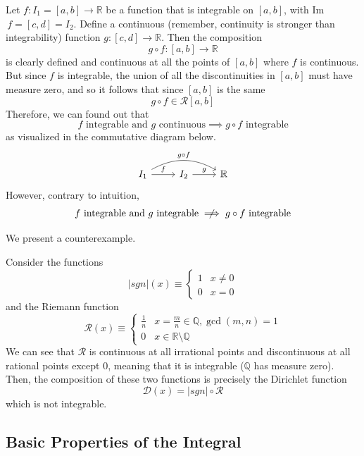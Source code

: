 \documentclass{article}
\begin{document}
      \begin{proposition}
      Let $f: I_1 = [a, b] \longrightarrow\mathbb{R}$ be a function that is integrable on $[a, b]$, with Im$\,f = [c, d] = I_2$. Define a continuous (remember, continuity is stronger than integrability) function $g: [c, d] \longrightarrow \mathbb{R}$. Then the composition
      \[g \circ f: [a, b] \longrightarrow \mathbb{R}\]
      is clearly defined and continuous at all the points of $[a, b]$ where $f$ is continuous. But since $f$ is integrable, the union of all the discontinuities in $[a, b]$ must have measure zero, and so it follows that since $[a, b]$ is the same  
      \[g \circ f \in \mathcal{R}[a, b]\]
      Therefore, we can found out that 
      \[f \text{ integrable and } g \text{ continuous} \implies g \circ f \text{ integrable}\]
      as visualized in the commutative diagram below. 
      \[
        \begin{tikzcd}
          I_1 \arrow[r, "f"] \arrow[rr, bend left, "g \circ f"] & I_2 \arrow[r, "g"] & \mathbb{R}
        \end{tikzcd}
      \]
      However, contrary to intuition, 
      \[f \text{ integrable and } g \text{ integrable} \centernot\implies g \circ f \text{ integrable}\]
      \end{proposition}

      We present a counterexample. 
    \begin{example}
    Consider the functions
    \[|sgn|(x) \equiv \begin{cases}
    1 & x \neq 0 \\
    0 & x = 0
    \end{cases}\]
    and the Riemann function 
    \[\mathcal{R}(x) \equiv \begin{cases}
    \frac{1}{n} & x = \frac{m}{n} \in \mathbb{Q}, \gcd(m, n) = 1 \\
    0 & x \in \mathbb{R} \setminus \mathbb{Q}
    \end{cases}\]
    We can see that $\mathcal{R}$ is continuous at all irrational points and discontinuous at all rational points except $0$, meaning that it is integrable ($\mathbb{Q}$ has measure zero). Then, the composition of these two functions is precisely the Dirichlet function
    \[\mathcal{D}(x) = |sgn| \circ \mathcal{R}\]
    which is not integrable. 
    \end{example}

    \subsection{Basic Properties of the Integral}
\end{document}
